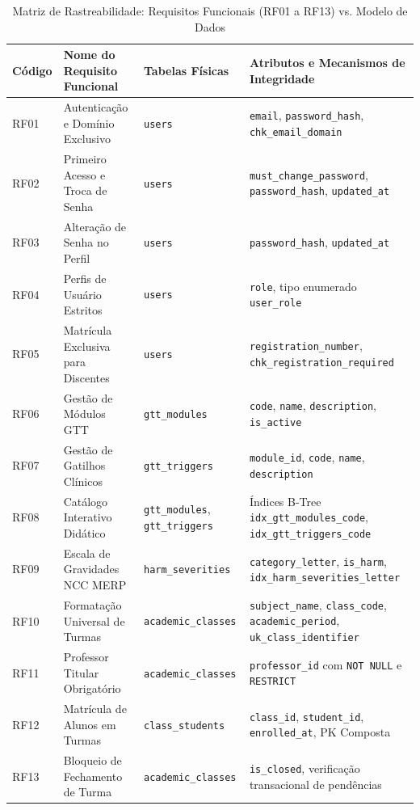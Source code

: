\begin{table}[!ht]
\centering
\caption{Matriz de Rastreabilidade: Requisitos Funcionais (RF01 a RF13) vs. Modelo de Dados}
\label{tab_rastreabilidade_dados_1}
\footnotesize
\begin{tabularx}{\textwidth}{p{1.2cm} p{3.8cm} p{3.8cm} X}
\toprule
\textbf{Código} & \textbf{Nome do Requisito Funcional} & \textbf{Tabelas Físicas} & \textbf{Atributos e Mecanismos de Integridade} \\
\midrule
RF01 & Autenticação e Domínio Exclusivo & \texttt{users} & \texttt{email}, \texttt{password\_hash}, \texttt{chk\_email\_domain} \\
RF02 & Primeiro Acesso e Troca de Senha & \texttt{users} & \texttt{must\_change\_password}, \texttt{password\_hash}, \texttt{updated\_at} \\
RF03 & Alteração de Senha no Perfil & \texttt{users} & \texttt{password\_hash}, \texttt{updated\_at} \\
RF04 & Perfis de Usuário Estritos & \texttt{users} & \texttt{role}, tipo enumerado \texttt{user\_role} \\
RF05 & Matrícula Exclusiva para Discentes & \texttt{users} & \texttt{registration\_number}, \texttt{chk\_registration\_required} \\
RF06 & Gestão de Módulos GTT & \texttt{gtt\_modules} & \texttt{code}, \texttt{name}, \texttt{description}, \texttt{is\_active} \\
RF07 & Gestão de Gatilhos Clínicos & \texttt{gtt\_triggers} & \texttt{module\_id}, \texttt{code}, \texttt{name}, \texttt{description} \\
RF08 & Catálogo Interativo Didático & \texttt{gtt\_modules}, \texttt{gtt\_triggers} & Índices B-Tree \texttt{idx\_gtt\_modules\_code}, \texttt{idx\_gtt\_triggers\_code} \\
RF09 & Escala de Gravidades NCC MERP & \texttt{harm\_severities} & \texttt{category\_letter}, \texttt{is\_harm}, \texttt{idx\_harm\_severities\_letter} \\
RF10 & Formatação Universal de Turmas & \texttt{academic\_classes} & \texttt{subject\_name}, \texttt{class\_code}, \texttt{academic\_period}, \texttt{uk\_class\_identifier} \\
RF11 & Professor Titular Obrigatório & \texttt{academic\_classes} & \texttt{professor\_id} com \texttt{NOT NULL} e \texttt{RESTRICT} \\
RF12 & Matrícula de Alunos em Turmas & \texttt{class\_students} & \texttt{class\_id}, \texttt{student\_id}, \texttt{enrolled\_at}, PK Composta \\
RF13 & Bloqueio de Fechamento de Turma & \texttt{academic\_classes} & \texttt{is\_closed}, verificação transacional de pendências \\
\bottomrule
\end{tabularx}
\end{table}

